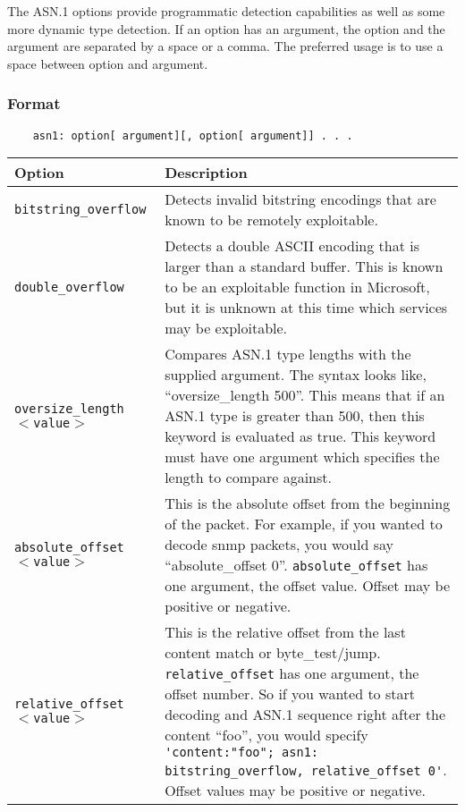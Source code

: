 \documentclass[english]{report}
\begin{document}
The ASN.1 options provide programmatic detection capabilities as well as some
more dynamic type detection.  If an option has an argument, the option and the
argument are separated by a space or a comma.  The preferred usage is to use a
space between option and argument.

\subsubsection{Format}

\begin{verbatim}
    asn1: option[ argument][, option[ argument]] . . . 
\end{verbatim}

\begin{tabular}{| l | p{4.5in} |}
\hline
{\bf Option} & {\bf Description}\\
\hline

\hline
\texttt{bitstring\_overflow} &

Detects invalid bitstring encodings that are known to be remotely exploitable.
\\

\hline
\texttt{double\_overflow} &

Detects a double ASCII encoding that is larger than a standard buffer.  This is
known to be an exploitable function in Microsoft, but it is unknown at this
time which services may be exploitable. \\

\hline
\texttt{oversize\_length $<$value$>$} &

Compares ASN.1 type lengths with the supplied argument.  The syntax looks like,
``oversize\_length 500''.  This means that if an ASN.1 type is greater than
500, then this keyword is evaluated as true.  This keyword must have one
argument which specifies the length to compare against. \\

\hline
\texttt{absolute\_offset $<$value$>$} &

This is the absolute offset from the beginning of the packet.  For example, if
you wanted to decode snmp packets, you would say ``absolute\_offset 0''.
\texttt{absolute\_offset} has one argument, the offset value.  Offset may be
positive or negative. \\  

\hline
\texttt{relative\_offset $<$value$>$} &

This is the relative offset from the last content match or byte\_test/jump.
\texttt{relative\_offset} has one argument, the offset number.  So if you
wanted to start decoding and ASN.1 sequence right after the content ``foo'',
you would specify \verb!'content:"foo"; asn1: bitstring_overflow, relative_offset 0'!.
Offset values may be positive or negative. \\ 

\hline
\end{tabular}
\end{document}

